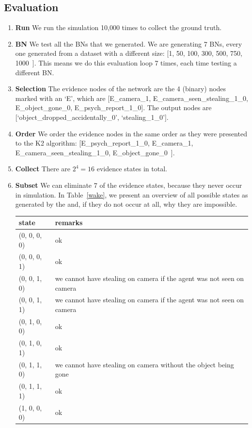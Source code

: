 \documentclass[12pt]{article}
\begin{document}
\subsection{Evaluation}
\begin{enumerate}
\item \textbf{Run} We run the simulation 10,000 times to collect the ground truth.
\item \textbf{BN} We test all the BNs that we generated. We are generating 7 BNs, every one generated from a dataset with a different size:  [1, 50, 100, 300, 500, 750, 1000~]. This means we do this evaluation loop 7 times, each time testing a different BN.
\item \textbf{Selection} The evidence nodes of the network are the 4 (binary) nodes marked with an `E', which are [E\_camera\_1, E\_camera\_seen\_stealing\_1\_0, E\_object\_gone\_0, E\_psych\_report\_1\_0]. The output nodes are [`object\_dropped\_accidentally\_0', `stealing\_1\_0'].
\item \textbf{Order} We order the evidence nodes in the same order as they were presented to the K2 algorithm:  [E\_psych\_report\_1\_0, E\_camera\_1,  E\_camera\_seen\_stealing\_1\_0, E\_object\_gone\_0~].
\item \textbf{Collect} There are $2^4 = 16$ evidence states in total.
\item \textbf{Subset} We can eliminate $7$ of the evidence states, because they never occur in simulation. In Table~\ref{wake}, we present an overview of all possible states as generated by the and, if they do not occur at all, why they are impossible.
\begin{table}[htbp]
\begin{center}
\begin{tabular}{|l|l|}
\hline
state & remarks \\
\hline
(0, 0, 0, 0)  & ok\\
(0, 0, 0, 1) & ok\\
(0, 0, 1, 0) & we cannot have stealing on camera if the agent was not seen on camera\\
(0, 0, 1, 1) & we cannot have stealing on camera if the agent was not seen on camera\\
(0, 1, 0, 0) & ok\\
(0, 1, 0, 1) & ok \\
(0, 1, 1, 0) & we cannot have stealing on camera without the object being gone\\
(0, 1, 1, 1) & ok\\
(1, 0, 0, 0) & ok\\

\end{tabular}
\end{center}
\end{table}
\end{enumerate}
\end{document}
